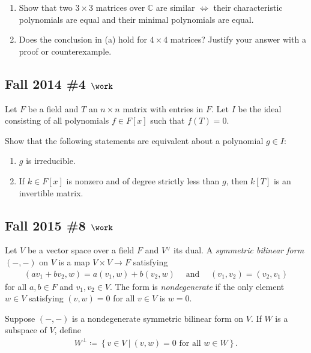 \begin{enumerate}
\def\labelenumi{\alph{enumi}.}
\item
  Show that two \(3\times 3\) matrices over \({\mathbb{C}}\) are similar
  \(\iff\) their characteristic polynomials are equal and their minimal
  polynomials are equal.
\item
  Does the conclusion in (a) hold for \(4\times 4\) matrices? Justify
  your answer with a proof or counterexample.
\end{enumerate}

\hypertarget{fall-2014-4-work}{%
\subsection{\texorpdfstring{Fall 2014 \#4
\(\work\)}{Fall 2014 \#4 \textbackslash work}}\label{fall-2014-4-work}}

Let \(F\) be a field and \(T\) an \(n\times n\) matrix with entries in
\(F\). Let \(I\) be the ideal consisting of all polynomials
\(f\in F[x]\) such that \(f(T) =0\).

Show that the following statements are equivalent about a polynomial
\(g\in I\):

\begin{enumerate}
\def\labelenumi{\alph{enumi}.}
\item
  \(g\) is irreducible.
\item
  If \(k\in F[x]\) is nonzero and of degree strictly less than \(g\),
  then \(k[T]\) is an invertible matrix.
\end{enumerate}

\hypertarget{fall-2015-8-work}{%
\subsection{\texorpdfstring{Fall 2015 \#8
\(\work\)}{Fall 2015 \#8 \textbackslash work}}\label{fall-2015-8-work}}

Let \(V\) be a vector space over a field \(F\) and \(V {}^{ \vee }\) its
dual. A \emph{symmetric bilinear form} \(({-}, {-})\) on \(V\) is a map
\(V\times V\to F\) satisfying
\begin{align*}
(av_1 + b v_2, w) = a(v_1, w) + b(v_2, w) {\quad \operatorname{and} \quad} (v_1, v_2) = (v_2, v_1)
\end{align*}
for all \(a, b\in F\) and \(v_1, v_2 \in V\). The form is
\emph{nondegenerate} if the only element \(w\in V\) satisfying
\((v, w) = 0\) for all \(v\in V\) is \(w=0\).

Suppose \(({-}, {-})\) is a nondegenerate symmetric bilinear form on
\(V\). If \(W\) is a subspace of \(V\), define
\begin{align*}
W^{\perp} \coloneqq\left\{{v\in V {~\mathrel{\Big|}~}(v, w) = 0 \text{ for all } w\in W}\right\}
.\end{align*}

